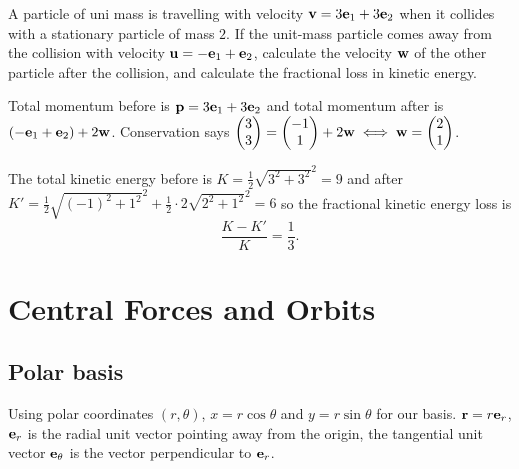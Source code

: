 \documentclass[10pt, a4paper]{article}
\begin{document}
\begin{example}
    A particle of uni mass is travelling with velocity $\mathbf{v} = 3\mathbf{e}_1 + 3\mathbf{e}_2$ when it collides with a stationary particle of mass $2$.
    If the unit-mass particle comes away from the collision with velocity $\mathbf{u} = -\mathbf{e}_1 + \mathbf{e}_2$,
    calculate the velocity $\mathbf{w}$ of the other particle after the collision,
    and calculate the fractional loss in kinetic energy.

    \begin{solution}
        Total momentum before is $\mathbf{p} = 3\mathbf{e}_1 + 3\mathbf{e}_2$ and total momentum after is $(-\mathbf{e}_1 + \mathbf{e}_2) + 2\mathbf{w}$.
        Conservation says
        $\begin{pmatrix}
            3 \\ 3
        \end{pmatrix} = \begin{pmatrix}
            -1 \\ 1
        \end{pmatrix} + 2\mathbf{w} \iff \mathbf{w} = \begin{pmatrix}
            2 \\ 1
        \end{pmatrix}$.

        The total kinetic energy before is $K = \frac{1}{2}\sqrt{3 ^ 2 + 3 ^ 2} ^ 2 = 9$ and after $K' = \frac{1}{2}\sqrt{(-1) ^ 2 + 1 ^ 2} ^ 2 + \frac{1}{2}\cdot 2\sqrt{2 ^ 2 + 1 ^ 2} ^ 2 = 6$ so the fractional kinetic energy loss is
        \[
        \frac{K - K'}{K} = \frac{1}{3}.
        \]
    \end{solution}
\end{example}

\newpage

\section{Central Forces and Orbits}

\subsection{Polar basis}
Using polar coordinates $(r, \theta)$,
$x = r\cos{\theta}$ and $y = r\sin{\theta}$ for our basis.
$\mathbf{r} = r\mathbf{e}_r$,
$\mathbf{e}_r$ is the radial unit vector pointing away from the origin,
the tangential unit vector $\mathbf{e}_{\theta}$ is the vector perpendicular to $\mathbf{e}_r$.
\end{document}
